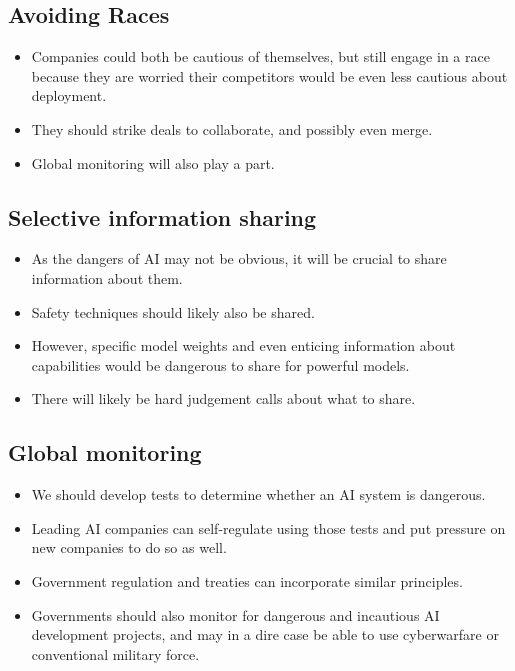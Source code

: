\documentclass{article}
\begin{document}
\begin{multicols}{2}
\subsection{Avoiding Races}
\begin{itemize}
\item Companies could both be cautious of themselves, but still engage in a race because they are worried their competitors would be even less cautious about deployment.
\item They should strike deals to collaborate, and possibly even merge.
\item Global monitoring will also play a part.
\end{itemize}

\subsection{Selective information sharing}
\begin{itemize}
\item As the dangers of AI may not be obvious, it will be crucial to share information about them.
\item Safety techniques should likely also be shared.
\item However, specific model weights and even enticing information about capabilities would be dangerous to share for powerful models.
\item There will likely be hard judgement calls about what to share.
\end{itemize}

\subsection{Global monitoring}
\begin{itemize}
\item We should develop tests to determine whether an AI system is dangerous.
\item Leading AI companies can self-regulate using those tests and put pressure on new companies to do so as well.
\item Government regulation and treaties can incorporate similar principles.
\item Governments should also monitor for dangerous and incautious AI development projects, and may in a dire case be able to use cyberwarfare or conventional military force.
\end{itemize}


\end{multicols}
\end{document}
